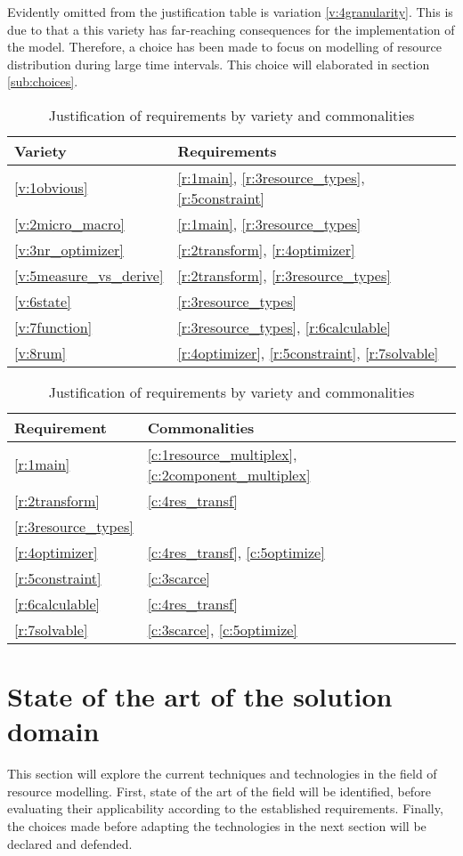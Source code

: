 Evidently omitted from the justification table is variation \ref{v:4granularity}. This is due to that a this variety has far-reaching consequences for the implementation of the model. Therefore, a choice has been made to focus on modelling of resource distribution during large time intervals. This choice will elaborated in section \ref{sub:choices}.
\begin{table}
\centering
\begin{tabular}{|l|l|} \hline
Variety & Requirements \\ \hline
\ref{v:1obvious} & \ref{r:1main}, \ref{r:3resource_types}, \ref{r:5constraint}		\\ \hline
\ref{v:2micro_macro} & \ref{r:1main}, \ref{r:3resource_types} 	\\ \hline
\ref{v:3nr_optimizer} & \ref{r:2transform}, \ref{r:4optimizer} 	\\ \hline
\ref{v:5measure_vs_derive} & \ref{r:2transform}, \ref{r:3resource_types} \\ 	\hline
\ref{v:6state} & \ref{r:3resource_types} 	\\ \hline
\ref{v:7function} & \ref{r:3resource_types}, \ref{r:6calculable} 	\\ \hline
\ref{v:8rum} & \ref{r:4optimizer}, \ref{r:5constraint}, \ref{r:7solvable} 	\\ \hline
\end{tabular}
\hspace{24px}
\begin{tabular}{|l|l|} \hline
Requirement & Commonalities \\ \hline
\ref{r:1main} & \ref{c:1resource_multiplex}, \ref{c:2component_multiplex}	\\ \hline
\ref{r:2transform} & \ref{c:4res_transf}	\\ \hline
\ref{r:3resource_types} &	\\ \hline
\ref{r:4optimizer} & \ref{c:4res_transf}, \ref{c:5optimize} 	\\ \hline
\ref{r:5constraint} & \ref{c:3scarce}	\\ \hline
\ref{r:6calculable} & \ref{c:4res_transf}	\\ \hline
\ref{r:7solvable} & \ref{c:3scarce}, \ref{c:5optimize}	\\ \hline
\end{tabular}
\caption{Justification of requirements by variety and commonalities}
\label{table:justification}
\end{table}

\section{State of the art of the solution domain}
This section will explore the current techniques and technologies in the field of resource modelling. First, state of the art of the field will be identified, before evaluating their applicability according to the established requirements. Finally, the choices made before adapting the technologies in the next section will be declared and defended.


